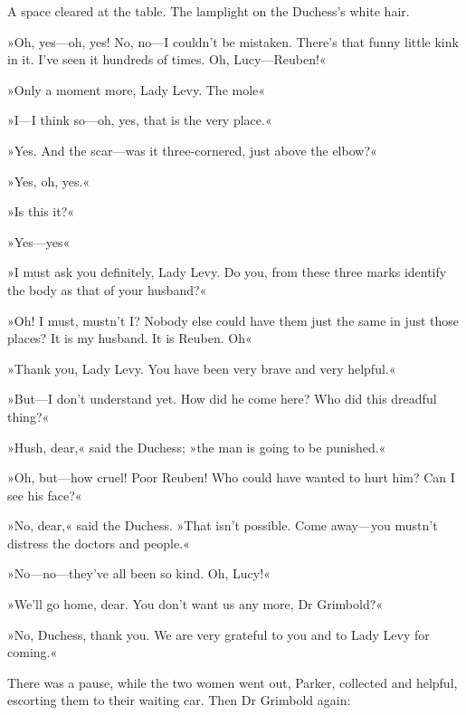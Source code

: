 A space cleared at the table. The lamplight on the Duchess's white hair.

»Oh, yes\allowbreak---\allowbreak oh, yes! No, no\allowbreak---\allowbreak I couldn't be mistaken. There's that funny little kink in it. I've seen it hundreds of times. Oh, Lucy\allowbreak---\allowbreak Reuben!«

»Only a moment more, Lady Levy. The mole\longdash«

»I\allowbreak---\allowbreak I think so\allowbreak---\allowbreak oh, yes, that is the very place.«

»Yes. And the scar\allowbreak---\allowbreak was it three-cornered, just above the elbow?«

»Yes, oh, yes.«

»Is this it?«

»Yes\allowbreak---\allowbreak yes\longdash«

»I must ask you definitely, Lady Levy. Do you, from these three marks identify the body as that of your husband?«

»Oh! I must, mustn't I? Nobody else could have them just the same in just those places? It is my husband. It is Reuben. Oh\longdash«

»Thank you, Lady Levy. You have been very brave and very helpful.«

»But\allowbreak---\allowbreak I don't understand yet. How did he come here? Who did this dreadful thing?«

»Hush, dear,« said the Duchess; »the man is going to be punished.«

»Oh, but\allowbreak---\allowbreak how cruel! Poor Reuben! Who could have wanted to hurt him? Can I see his face?«

»No, dear,« said the Duchess. »That isn't possible. Come away\allowbreak---\allowbreak you mustn't distress the doctors and people.«

»No\allowbreak---\allowbreak no---they've all been so kind. Oh, Lucy!«

»We'll go home, dear. You don't want us any more, Dr Grimbold?«

»No, Duchess, thank you. We are very grateful to you and to Lady Levy for coming.«

There was a pause, while the two women went out, Parker, collected and helpful, escorting them to their waiting car. Then Dr Grimbold again:

